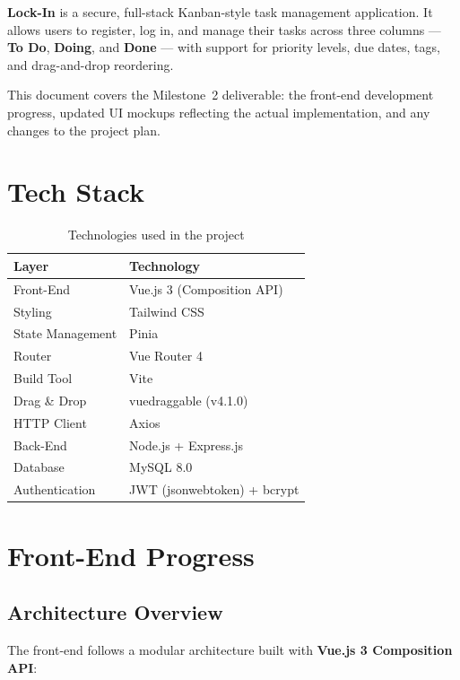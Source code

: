 \documentclass[12pt, a4paper]{article}
\begin{document}
\textbf{Lock-In} is a secure, full-stack Kanban-style task management application. It allows users to register, log in, and manage their tasks across three columns --- \textbf{To Do}, \textbf{Doing}, and \textbf{Done} --- with support for priority levels, due dates, tags, and drag-and-drop reordering.

This document covers the Milestone~2 deliverable: the front-end development progress, updated UI mockups reflecting the actual implementation, and any changes to the project plan.

\section{Tech Stack}

\begin{table}[H]
\centering
\begin{tabularx}{0.85\textwidth}{lX}
\toprule
\textbf{Layer} & \textbf{Technology} \\
\midrule
Front-End      & Vue.js 3 (Composition API) \\
Styling        & Tailwind CSS \\
State Management & Pinia \\
Router         & Vue Router 4 \\
Build Tool     & Vite \\
Drag \& Drop   & vuedraggable (v4.1.0) \\
HTTP Client    & Axios \\
Back-End       & Node.js + Express.js \\
Database       & MySQL 8.0 \\
Authentication & JWT (jsonwebtoken) + bcrypt \\
\bottomrule
\end{tabularx}
\caption{Technologies used in the project}
\end{table}

\section{Front-End Progress}

\subsection{Architecture Overview}

The front-end follows a modular architecture built with \textbf{Vue.js 3 Composition API}:
\end{document}
